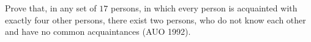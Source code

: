 Prove that, in any set of $17$ persons, in which every person is acquainted with exactly four other persons, there exist two persons, who do not know each other and have no common acquaintances (AUO 1992).
